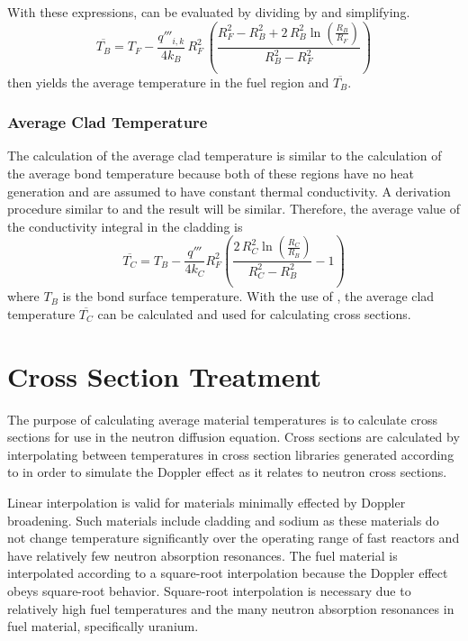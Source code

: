       With these expressions,  can be evaluated by 
      dividing  by  and 
      simplifying.
      \begin{equation}
        \label{eq:tb_bar}
        \overline{T_B} = T_F - \frac{q'''_{i,k}}{4 k_B} \, R_F^2 \, \left(
          \frac{R_F^2 - R_B^2 + 2\,R_B^2 \ln\left(\frac{R_B}{R_F}\right)}
          {R_B^2-R_F^2}\right)
      \end{equation}
       then yields the average temperature in the fuel region
      and $\overline{T_B}$.

    \subsubsection{Average Clad Temperature}
      The calculation of the average clad temperature is similar to the
      calculation of the average bond temperature because both of these regions
      have no heat generation and are assumed to have constant thermal
      conductivity. A derivation procedure similar to
       and the result will be similar. Therefore,
      the average value of the conductivity integral in the cladding is 
      \begin{equation}
        \label{eq:tc_bar}
        \overline{T_C} = T_B - \frac{q'''}{4 k_C} R_F^2 \left(
          \frac{2 \, R_C^2 \ln\left(\frac{R_C}{R_B}\right)}
          {R_C^2 - R_B^2}  - 1\right)
      \end{equation}
      where $T_B$ is the bond surface temperature. With the use of
      , the average clad temperature $\overline{T_C}$ can be
      calculated and used for calculating cross sections.

\section{Cross Section Treatment}
  The purpose of calculating average material temperatures is to calculate
  cross sections for use in the neutron diffusion equation. Cross sections are
  calculated by interpolating between temperatures in cross section libraries
  generated according to  in order to simulate
  the Doppler effect as it relates to neutron cross sections.

  Linear interpolation is valid for materials minimally effected by Doppler 
  broadening. Such materials include cladding and sodium as these materials do 
  not change temperature significantly over the operating range of fast reactors
  and have relatively few neutron absorption resonances. The fuel material is 
  interpolated according to a square-root interpolation because the Doppler 
  effect obeys square-root behavior. Square-root interpolation is necessary
  due to relatively high fuel temperatures and the many neutron absorption 
  resonances in fuel material, specifically uranium.

